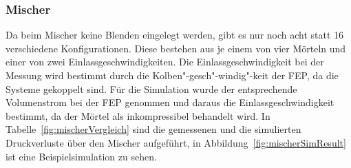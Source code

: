 \subsubsection{Mischer}
Da beim Mischer keine Blenden eingelegt werden, gibt es nur noch acht statt 16 verschiedene Konfigurationen. Diese bestehen aus je einem von vier Mörteln und einer von zwei Einlassgeschwindigkeiten.
Die Einlassgeschwindigkeit bei der Messung wird bestimmt durch die Kolben"-gesch"-windig"-keit der FEP, da die Systeme gekoppelt sind. Für die Simulation wurde der entsprechende Volumenstrom bei der FEP genommen und daraus die Einlassgeschwindigkeit bestimmt, da der Mörtel als inkompressibel behandelt wird.
In Tabelle~\ref{fig:mischerVergleich} sind die gemessenen und die simulierten Druckverluste über den Mischer aufgeführt, in Abbildung~\ref{fig:mischerSimResult} ist eine Beispielsimulation zu sehen.
%
\begin{table}[tb]
\noindent{}
    \caption{Die gemessenen und simulierten Konfigurationen des Mischers mit den rein scherratenabhängigen Modellen.}
    \label{fig:mischerVergleich}
\end{table}

